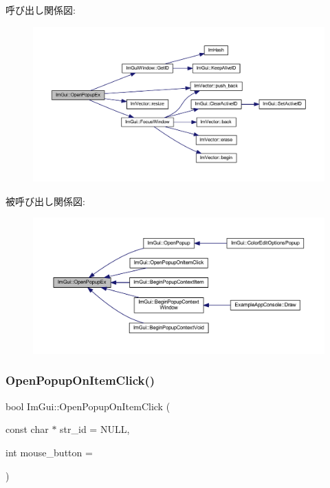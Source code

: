 呼び出し関係図\+:\nopagebreak
\begin{figure}[H]
\begin{center}
\leavevmode
\includegraphics[width=350pt]{namespace_im_gui_a92683a696319581577334d6b798e2f97_cgraph}
\end{center}
\end{figure}
被呼び出し関係図\+:\nopagebreak
\begin{figure}[H]
\begin{center}
\leavevmode
\includegraphics[width=350pt]{namespace_im_gui_a92683a696319581577334d6b798e2f97_icgraph}
\end{center}
\end{figure}
\mbox{\label{namespace_im_gui_a546fc46d8f510cb17a2f272891e2f5b3}} 
\subsubsection{\texorpdfstring{Open\+Popup\+On\+Item\+Click()}{OpenPopupOnItemClick()}}
{\footnotesize\ttfamily bool Im\+Gui\+::\+Open\+Popup\+On\+Item\+Click (\begin{DoxyParamCaption}\item[{const char $\ast$}]{str\+\_\+id = {\ttfamily NULL},  }\item[{int}]{mouse\+\_\+button = {} }\end{DoxyParamCaption})}



